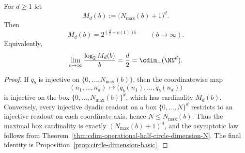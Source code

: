 \begin{corollary}%
\label{cor:cdim-operational-half-circle-dimension-Nd}
For $d\ge 1$ let
\[
M_d(b):=\bigl(N_{\max}(b)+1\bigr)^d.
\]
Then
\[
M_d(b)=2^{(\frac{d}{2}+o(1))b}
\qquad(b\to\infty).
\]
Equivalently,
\[
\lim_{b\to\infty}\frac{\log_2 M_d(b)}{b}=\frac{d}{2}
=\cdim_+(\NN^d).
\]
\end{corollary}

\begin{proof}
If $q_b$ is injective on $\{0,\dots,N_{\max}(b)\}$, then the coordinatewise
map
\[
(n_1,\dots,n_d)\longmapsto \bigl(q_b(n_1),\dots,q_b(n_d)\bigr)
\]
is injective on the box $\{0,\dots,N_{\max}(b)\}^d$, which has cardinality
$M_d(b)$.  Conversely, every injective dyadic readout on a box
$\{0,\dots,N\}^d$ restricts to an injective readout on each coordinate
axis, hence $N\le N_{\max}(b)$.  Thus the maximal box cardinality is
exactly $(N_{\max}(b)+1)^d$, and the asymptotic law follows from
Theorem~\ref{thm:cdim-operational-half-circle-dimension-N}.  The final
identity is Proposition~\ref{prop:circle-dimension-basic}.
\end{proof}
